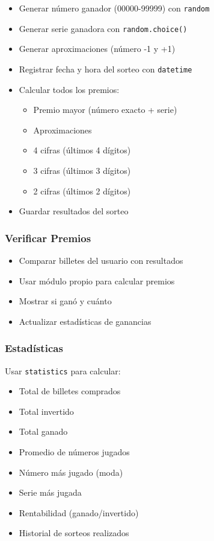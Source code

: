 \documentclass[12pt,a4paper]{article}
\begin{document}
\begin{itemize}
    \item Generar número ganador (00000-99999) con \texttt{random}
    \item Generar serie ganadora con \texttt{random.choice()}
    \item Generar aproximaciones (número -1 y +1)
    \item Registrar fecha y hora del sorteo con \texttt{datetime}
    \item Calcular todos los premios:
    \begin{itemize}
        \item Premio mayor (número exacto + serie)
        \item Aproximaciones
        \item 4 cifras (últimos 4 dígitos)
        \item 3 cifras (últimos 3 dígitos)
        \item 2 cifras (últimos 2 dígitos)
    \end{itemize}
    \item Guardar resultados del sorteo
\end{itemize}

\subsubsection{Verificar Premios}

\begin{itemize}
    \item Comparar billetes del usuario con resultados
    \item Usar módulo propio para calcular premios
    \item Mostrar si ganó y cuánto
    \item Actualizar estadísticas de ganancias
\end{itemize}

\subsubsection{Estadísticas}

Usar \texttt{statistics} para calcular:
\begin{itemize}
    \item Total de billetes comprados
    \item Total invertido
    \item Total ganado
    \item Promedio de números jugados
    \item Número más jugado (moda)
    \item Serie más jugada
    \item Rentabilidad (ganado/invertido)
    \item Historial de sorteos realizados
\end{itemize}
\end{document}
